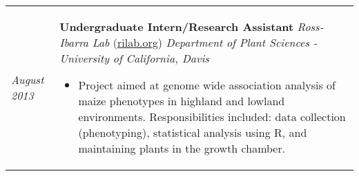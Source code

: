 ﻿\documentclass[a4paper]{article}
\begin{document}
\begin{tabular}{p{3cm} p{14cm}}
\textit{August 2013}\newline
& 
\vspace{0pt}
\textbf{Undergraduate Intern/Research Assistant}\newline
\textit{Ross-Ibarra Lab} (\href{http://www.rilab.org/}{rilab.org})\newline
\textit{Department of Plant Sciences - University of California, Davis}
\begin{itemize}[noitemsep,topsep=0pt]
  \item Project aimed at genome wide association analysis of maize phenotypes in highland and lowland environments. Responsibilities included: data collection (phenotyping), statistical analysis using R, and maintaining plants in the growth chamber.
\end{itemize}
\end{tabular}
\end{document}

